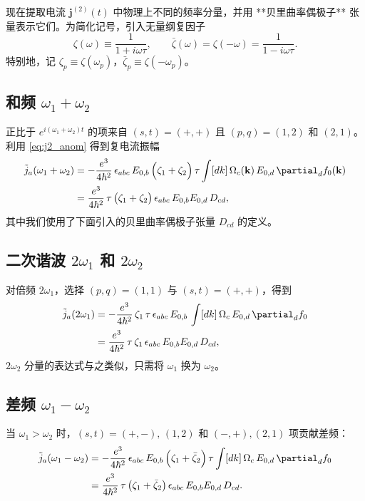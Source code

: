 现在提取电流 \(\mathbf{j}^{(2)}(t)\) 中物理上不同的频率分量，并用 **贝里曲率偶极子** 张量表示它们。为简化记号，引入无量纲复因子
\begin{equation}
\zeta(\omega) \equiv \frac{1}{1+i\omega\tau},
\qquad
\bar\zeta(\omega) = \zeta(-\omega) = \frac{1}{1-i\omega\tau}.
\label{eq:zeta_def}
\end{equation}
特别地，记 \(\zeta_p \equiv \zeta(\omega_p)\)，\(\bar\zeta_p \equiv \zeta(-\omega_p)\)。

\subsection{和频 \(\omega_1+\omega_2\)}

正比于 \(e^{i(\omega_1+\omega_2)t}\) 的项来自 \((s,t)=(+,+)\) 且 \((p,q)=(1,2)\) 和 \((2,1)\)。利用 \eqref{eq:j2_anom} 得到复电流振幅
\begin{align}
\tilde j_a(\omega_1+\omega_2) &= -\frac{e^3}{4\hbar^2}\,\epsilon_{abc}\,E_{0,b}\,
\Big(\zeta_1 + \zeta_2\Big)\,\tau
\int [dk]\, \Omega_c(\mathbf{k})\,E_{0,d}\,\partial_d f_0(\mathbf{k})\notag\\
&= \frac{e^3}{4\hbar^2}\,\tau\,\big(\zeta_1+\zeta_2\big)\,
\epsilon_{abc}\,E_{0,b}E_{0,d}\,D_{cd},
\label{eq:j_sum}
\end{align}
其中我们使用了下面引入的贝里曲率偶极子张量 \(D_{cd}\) 的定义。

\subsection{二次谐波 \(2\omega_1\) 和 \(2\omega_2\)}

对倍频 \(2\omega_1\)，选择 \((p,q)=(1,1)\) 与 \((s,t)=(+,+)\)，得到
\begin{align}
\tilde j_a(2\omega_1) &= -\frac{e^3}{4\hbar^2}\,\zeta_1\,\tau\,
\epsilon_{abc}\,E_{0,b}\, \int [dk]\, \Omega_c\,E_{0,d}\,\partial_d f_0 \notag\\
&= \frac{e^3}{4\hbar^2}\,\tau\,\zeta_1\,
\epsilon_{abc}\,E_{0,b}E_{0,d}\,D_{cd},
\label{eq:j_2w1}
\end{align}
\(2\omega_2\) 分量的表达式与之类似，只需将 \(\omega_1\) 换为 \(\omega_2\)。

\subsection{差频 \(\omega_1-\omega_2\)}

当 \(\omega_1>\omega_2\) 时，\((s,t)=(+,-),\,(1,2)\) 和 \((-,+),(2,1)\) 项贡献差频：
\begin{align}
\tilde j_a(\omega_1-\omega_2) &= -\frac{e^3}{4\hbar^2}\,\epsilon_{abc}\,E_{0,b}\,
\Big(\zeta_1 + \bar\zeta_2\Big)\,\tau
\int [dk]\, \Omega_c\,E_{0,d}\,\partial_d f_0 \notag\\
&= \frac{e^3}{4\hbar^2}\,\tau\,\big(\zeta_1+\bar\zeta_2\big)\,
\epsilon_{abc}\,E_{0,b}E_{0,d}\,D_{cd}.
\label{eq:j_diff}
\end{align}

